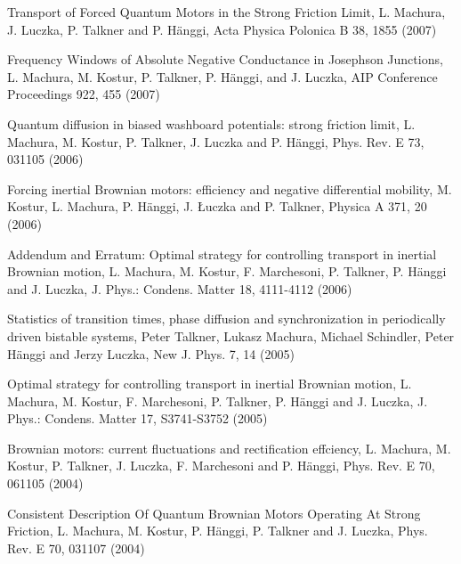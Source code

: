 \documentclass[11pt,a4paper,sans]{moderncv} %
\begin{document}
\begin{etaremune}
\item Transport of Forced Quantum Motors in the Strong Friction Limit, L. Machura, J. Luczka, P. Talkner and P. Hänggi, Acta Physica Polonica B 38,  1855 (2007)

\item Frequency Windows of Absolute Negative Conductance in Josephson Junctions, L. Machura, M. Kostur, P. Talkner, P. Hänggi, and J. Luczka, AIP Conference Proceedings 922,  455 (2007)

\item Quantum diffusion in biased washboard potentials: strong friction limit, L. Machura, M. Kostur, P. Talkner, J. Luczka and P. Hänggi, Phys. Rev. E 73,  031105 (2006)

\item Forcing inertial Brownian motors: efficiency and negative differential mobility, M. Kostur, L. Machura, P. Hänggi, J. Łuczka and P. Talkner, Physica A 371,  20 (2006)

\item Addendum and Erratum: Optimal strategy for controlling transport in inertial Brownian motion, L. Machura, M. Kostur, F. Marchesoni, P. Talkner, P. Hänggi and J. Luczka, J. Phys.: Condens. Matter 18,  4111-4112 (2006)

\item Statistics of transition times, phase diffusion and synchronization in periodically driven bistable systems, Peter Talkner, Lukasz Machura, Michael Schindler, Peter Hänggi and Jerzy Luczka, New J. Phys. 7,  14 (2005)

\item Optimal strategy for controlling transport in inertial Brownian motion, L. Machura, M. Kostur, F. Marchesoni, P. Talkner, P. Hänggi and J. Luczka, J. Phys.: Condens. Matter 17,  S3741-S3752 (2005)

\item Brownian motors: current fluctuations and rectification effciency, L. Machura, M. Kostur, P. Talkner, J. Luczka, F. Marchesoni and P. Hänggi, Phys. Rev. E 70,  061105 (2004)

\item Consistent Description Of Quantum Brownian Motors Operating At Strong Friction, L. Machura, M. Kostur, P. Hänggi, P. Talkner and J. Luczka, Phys. Rev. E 70,  031107 (2004)

\end{etaremune}
\end{document}
